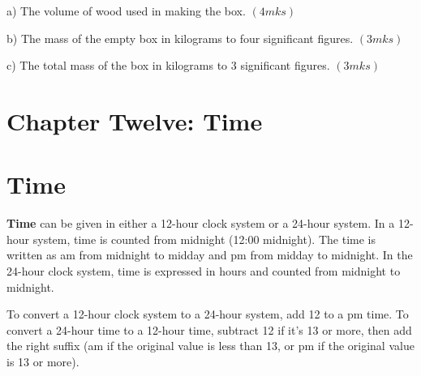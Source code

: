 \documentclass[
  a4paperpaper,
]{scrbook}
\begin{document}
\begin{tcolorbox}
\begin{enumerate}
  a) The volume of wood used in making the box. \hspace{6cm} \((4mks)\)

  b) The mass of the empty box in kilograms to four significant figures.
  \hspace{3cm}\((3mks)\)

  c) The total mass of the box in kilograms to 3 significant figures.
  \hspace{3.8cm}\((3mks)\)
\end{enumerate}

\end{tcolorbox}


\hypertarget{chapter-twelve-time}{%
\chapter{Chapter Twelve: Time}\label{chapter-twelve-time}}


\hypertarget{time}{%
\chapter*{Time}\label{time}}


\textbf{Time} can be given in either a 12-hour clock system or a 24-hour
system. In a 12-hour system, time is counted from midnight (12:00
midnight). The time is written as am from midnight to midday and pm from
midday to midnight. In the 24-hour clock system, time is expressed in
hours and counted from midnight to midnight.

To convert a 12-hour clock system to a 24-hour system, add 12 to a pm
time. To convert a 24-hour time to a 12-hour time, subtract 12 if it's
13 or more, then add the right suffix (am if the original value is less
than 13, or pm if the original value is 13 or more).
\end{document}

